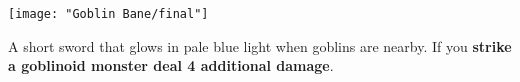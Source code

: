 
\begin{center}
\texttt{[image: "Goblin Bane/final"]}
\end{center}
A short sword that glows in pale blue light when goblins are nearby. If you \textbf{strike a goblinoid monster deal 4 additional damage}.